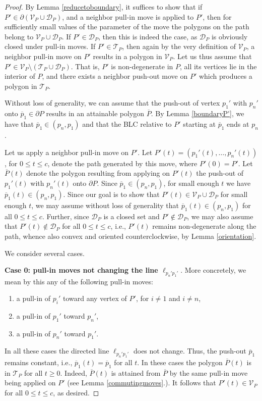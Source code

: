 \documentclass[11pt]{amsart}
\theoremstyle{remark}
\numberwithin{equation}{section}
\newcommand{\D}{\mathcal{D}}
\newcommand{\TT}{\mathcal{T}}
\newcommand{\V}{\mathcal{V}}
\renewcommand{\leq}{\leqslant}
\renewcommand{\geq}{\geqslant}
\begin{document}
\begin{proof}
By Lemma \ref{reducetoboundary}, it suffices to show that if $P'\in \partial(\V_P\cup \D_P)$, and a neighbor pull-in move is applied to $P'$, then for sufficiently
small values of the parameter of the move the polygons on the path belong to $\V_P\cup\D_P$. If $P'\in \D_P$, then this is indeed the case, as $\mathcal D_P$ is obviously closed under pull-in moves. If $P'\in \mathcal T_P$, then again by the very definition of $\mathcal V_P$, a neighbor pull-in move on $P'$ results in a polygon in $\mathcal V_P$. Let us thus assume that $P'\in \V_P \setminus (\mathcal T_P \cup \mathcal D_P)$. That is, $P'$ is non-degenerate in $P$, all its vertices lie in the interior of $P$, and there exists a neighbor push-out move on $P'$ which produces a polygon in $\mathcal T_P$. 

Without loss of generality, we can assume that the push-out of vertex $p_1'$ with $p_n'$ onto $\overline p_1\in\partial P$ results in an attainable polygon $\overline P$. By Lemma \ref{boundaryP'}, we have that $\overline p_1\in (p_n,p_1)$ and  that the BLC relative to $P'$ starting at $\overline p_1$ ends at $p_n$.


Let us apply a neighbor pull-in move on $P'$. Let $P'(t)=(p_1'(t),\ldots,p_n'(t))$,  for $0\leq t\leq c$, 
denote the path generated by this move, where $P'(0)=P'$. Let $\overline P(t)$ denote the polygon resulting from applying on $P'(t)$ the push-out of $p_1'(t)$ with $p_n'(t)$ onto $\partial P$. Since $\overline p_1\in (p_n,p_1)$, for small enough $t$ we have $\overline p_1(t)\in (p_n,p_1)$. Since our goal is to show that $P'(t)\in \V_P\cup \D_P$ for small enough $t$, we may assume without loss of generality that $\overline p_1(t)\in (p_n,p_1)$ for all $0\leq t\leq c$. Further, since $\D_P$ is a closed set and
$P'\notin \D_P$, we may also assume that $P'(t)\notin  \D_P$ for all $0\leq t\leq c$, i.e., $P'(t)$ remains non-degenerate along the path, whence also convex and oriented counterclockwise, by Lemma \ref{orientation}.


We consider several cases.


\textbf{Case 0: pull-in moves not changing the line $\ell_{p_n'p_1'}$}. More concretely, we mean by this any of the following pull-in moves:
\begin{enumerate}
\item a pull-in  of $p_i'$ toward any vertex of $P'$, for $i\neq 1$ and $i\neq n$,
\item a pull-in  of $p_1'$ toward $p_n'$, 
\item a pull-in  of $p_n'$ toward $p_1'$. 
\end{enumerate}
In all these cases the directed line $\ell_{p_n'p_1'}$ does not change. Thus, the push-out $\overline p_1$ remains constant, i.e., $\overline p_1(t)=\overline p_1$ for all $t$.  In these cases the polygon $\overline P(t)$ is in $\TT_P$ for all $t\geq 0$. Indeed, $\overline P(t)$ is attained from $\overline P$ by the same pull-in move being applied on $P'$ (see Lemma \ref{commutingmoves}.). It follows that $P'(t)\in \V_P$ for all $0\leq t\leq c$, as desired.



\end{proof}
\end{document}
